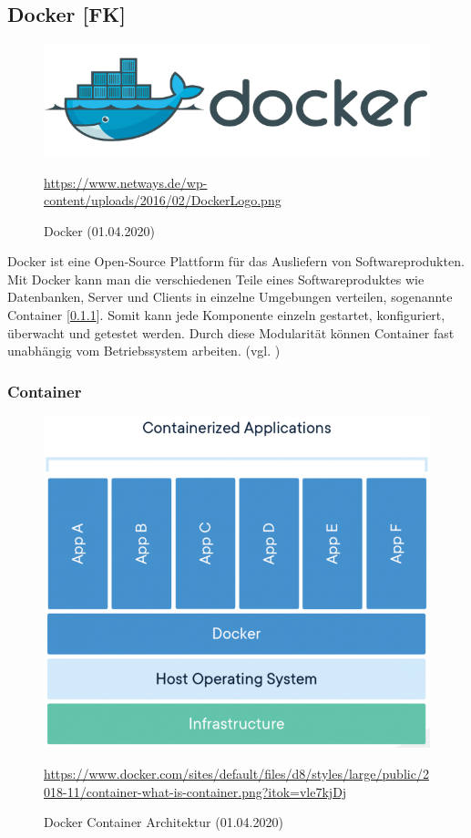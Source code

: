 \subsection{Docker [FK]}
\begin{figure}[H]
    \centering
    \includegraphics[scale=.67]{images/DockerLogo.png}
    \caption{Docker (01.04.2020)}
    \url{https://www.netways.de/wp-content/uploads/2016/02/DockerLogo.png}
\end{figure}
Docker ist eine Open-Source Plattform für das Ausliefern von Softwareprodukten. Mit Docker kann man die verschiedenen Teile eines Softwareproduktes wie Datenbanken, Server und Clients in einzelne Umgebungen verteilen, sogenannte Container [\ref{ssec:DockerContainer}]. Somit kann jede Komponente einzeln gestartet, konfiguriert, überwacht und getestet werden. Durch diese Modularität können Container fast unabhängig vom Betriebssystem arbeiten. (vgl. \cite{DockerIntro})
\subsubsection{Container} \label{ssec:DockerContainer}
\begin{figure}[H]
    \centering
    \includegraphics{images/what-is-a-container.png}
    \caption{Docker Container Architektur (01.04.2020)}
    \url{https://www.docker.com/sites/default/files/d8/styles/large/public/2018-11/container-what-is-container.png?itok=vle7kjDj}
    \label{img:what-is-a-container}
\end{figure}

